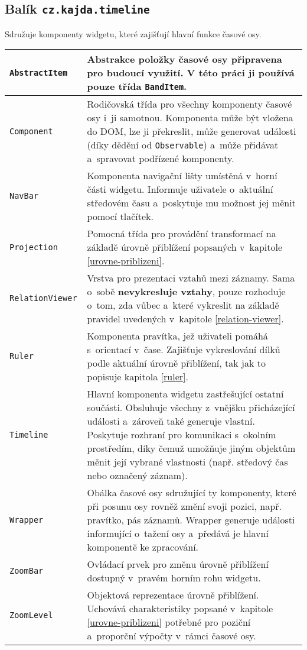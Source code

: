 			\subsection{Balík {\tt cz.kajda.timeline}}
				Sdružuje komponenty widgetu, které zajišťují hlavní funkce časové osy.
				\begin{longtable}{|p{}p{}|}
					\hline
					{\tt AbstractItem} & Abstrakce položky časové osy připravena pro budoucí využití. V této práci ji používá pouze třída {\tt BandItem}. \\
					\hline
					\tt Component & Rodičovská třída pro všechny komponenty časové osy i~ji samotnou. Komponenta může být vložena do DOM, lze ji překreslit, může generovat události (díky dědění od {\tt Observable}) a~může přidávat a~spravovat podřízené komponenty.\\
					\hline
					\tt NavBar & Komponenta navigační lišty umístěná v~horní části widgetu. Informuje uživatele o~aktuální středovém času a~poskytuje mu možnost jej měnit pomocí tlačítek.\\
					\hline
					\tt Projection & Pomocná třída pro provádění transformací na základě úrovně přiblížení popsaných v~kapitole \ref{urovne-priblizeni}.\\
					\hline
					\tt RelationViewer & Vrstva pro prezentaci vztahů mezi záznamy. Sama o~sobě {\bf nevykresluje vztahy}, pouze rozhoduje o~tom, zda vůbec a~které vykreslit na základě pravidel uvedených v~kapitole \ref{relation-viewer}.\\
					\hline
					\tt Ruler & Komponenta pravítka, jež uživateli pomáhá s~orientací v~čase. Zajišťuje vykreslování dílků podle aktuální úrovně přiblížení, tak jak to popisuje kapitola \ref{ruler}.\\
					\hline
					\tt Timeline & Hlavní komponenta widgetu zastřešující ostatní součásti. Obsluhuje všechny z~vnějšku přicházející události a~zároveň také generuje vlastní. Poskytuje rozhraní pro komunikaci s~okolním prostředím, díky čemuž umožňuje jiným objektům měnit její vybrané vlastnosti (např. středový čas nebo označený záznam).\\
					\hline
					\tt Wrapper & Obálka časové osy sdružující ty komponenty, které při posunu osy rovněž změní svoji pozici, např. pravítko, pás záznamů. Wrapper generuje události informující o~tažení osy a~předává je hlavní komponentě ke zpracování.\\
					\hline
					\tt ZoomBar & Ovládací prvek pro změnu úrovně přiblížení dostupný v~pravém horním rohu widgetu. \\
					\hline
					\tt ZoomLevel & Objektová reprezentace úrovně přiblížení. Uchovává charakteristiky popsané v~kapitole \ref{urovne-priblizeni} potřebné pro poziční a~proporční výpočty v~rámci časové osy. \\
					\hline
				\end{longtable}
